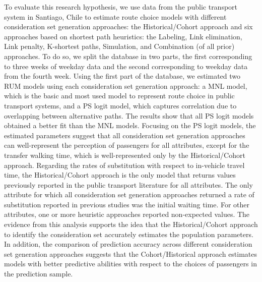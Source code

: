 \documentclass[12pt,a4paper]{article}
\begin{document}
To evaluate this research hypothesis, we use data from the public transport system in Santiago, Chile to estimate route choice models with different consideration set generation approaches: the Historical/Cohort approach and six approaches based on shortest path heuristics: the Labeling, Link elimination, Link penalty, K-shortest paths, Simulation, and Combination (of all prior) approaches. To do so, we split the database in two parts, the first corresponding to three weeks of weekday data and the second corresponding to weekday data from the fourth week. Using the first part of the database, we estimated two RUM models using each consideration set generation approach: a MNL model, which is the basic and most used model to represent route choice in public transport systems, and a PS logit model, which captures correlation due to overlapping between alternative paths. The results show that all PS logit models obtained a better fit than the MNL models. Focusing on the PS logit models, the estimated parameters suggest that all consideration set generation approaches can well-represent the perception of passengers for all attributes, except for the transfer walking time, which is well-represented only by the Historical/Cohort approach. Regarding the rates of substitution with respect to in-vehicle travel time, the Historical/Cohort approach is the only model that returns values previously reported in the public transport literature for all attributes. The only attribute for which all consideration set generation approaches returned a rate of substitution reported in previous studies was the initial waiting time. For other attributes, one or more heuristic approaches reported non-expected values. The evidence from this analysis supports the idea that the Historical/Cohort approach to identify the consideration set accurately estimates the population parameters. In addition, the comparison of prediction accuracy across different consideration set generation approaches suggests that the Cohort/Historical approach estimates models with better predictive abilities with respect to the choices of passengers in the prediction sample. 




\end{document}
